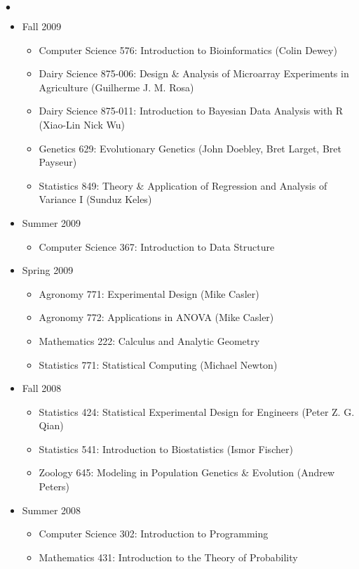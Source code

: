 \documentclass[margin,line,10pt]{res}
\newenvironment{list2}{
  \begin{list}{$\bullet$}{%
      \setlength{\itemsep}{0in}
      \setlength{\parsep}{0in} \setlength{\parskip}{0in}
      \setlength{\topsep}{0in} \setlength{\partopsep}{0in} 
      \setlength{\leftmargin}{0.2in}}}{\end{list}}
\begin{document}
\begin{resume}
\begin{list2}
\begin{itemize}
\item Fall 2009
\begin{itemize}
\item    Computer Science 576: Introduction to Bioinformatics (Colin Dewey)
\item    Dairy Science 875-006: Design \& Analysis of Microarray Experiments in Agriculture (Guilherme J. M. Rosa)
\item    Dairy Science 875-011: Introduction to Bayesian Data Analysis with R (Xiao-Lin Nick Wu)
\item    Genetics 629: Evolutionary Genetics (John Doebley, Bret Larget, Bret Payseur)
\item    Statistics 849: Theory \& Application of Regression and Analysis of Variance I (Sunduz Keles)
\end{itemize}




\item Summer 2009
\begin{itemize}
\item Computer Science 367: Introduction to Data Structure
\end{itemize}

\item Spring 2009
\begin{itemize}
\item Agronomy 771: Experimental Design (Mike Casler)
\item Agronomy 772: Applications in ANOVA (Mike Casler)
\item Mathematics 222: Calculus and Analytic Geometry
\item Statistics 771: Statistical Computing (Michael Newton)
\end{itemize}


\item Fall 2008
\begin{itemize}
\item Statistics 424: Statistical Experimental Design for Engineers (Peter Z. G. Qian)
\item Statistics 541: Introduction to Biostatistics (Ismor Fischer)
\item Zoology 645: Modeling in Population Genetics \& Evolution (Andrew Peters)
\end{itemize}

\item Summer 2008
\begin{itemize}
\item Computer Science 302: Introduction to Programming
\item Mathematics 431: Introduction to the Theory of Probability
\end{itemize}


\end{itemize}
\end{list2}
\end{resume}
\end{document}
